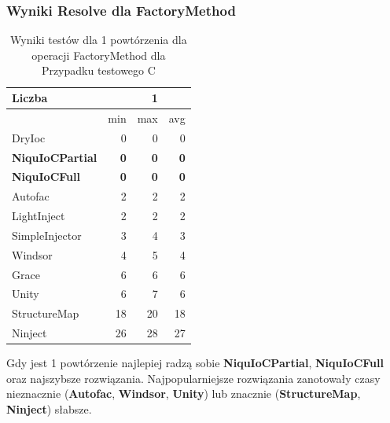 \documentclass[12pt]{article}
\begin{document}
\subsubsection{Wyniki Resolve dla FactoryMethod}
\begin{table}[H]
\captionsetup{belowskip=0pt,aboveskip=0pt}
\begin{center}
\begin{small}
	\begin{tabular}{ | l | r r r | }
    		\hline
Liczba & & 1 & \\ \hline
 & min & max & avg \\ \hline
DryIoc & 0 & 0 & 0 \\ \hline
\textbf{NiquIoCPartial} & \textbf{0} & \textbf{0} & \textbf{0} \\ \hline
\textbf{NiquIoCFull} & \textbf{0} & \textbf{0} & \textbf{0} \\ \hline
Autofac & 2 & 2 & 2 \\ \hline
LightInject & 2 & 2 & 2 \\ \hline
SimpleInjector & 3 & 4 & 3 \\ \hline
Windsor & 4 & 5 & 4 \\ \hline
Grace & 6 & 6 & 6 \\ \hline
Unity & 6 & 7 & 6 \\ \hline
StructureMap & 18 & 20 & 18 \\ \hline
Ninject & 26 & 28 & 27 \\ \hline
  	\end{tabular}
\end{small}
\end{center}
\caption{Wyniki testów dla 1 powtórzenia dla operacji FactoryMethod dla Przypadku testowego C}
\label{TestCaseC_FactoryMethod1}
\end{table}
Gdy jest 1 powtórzenie najlepiej radzą sobie \textbf{NiquIoCPartial}, \textbf{NiquIoCFull} oraz najszybsze rozwiązania. Najpopularniejsze rozwiązania zanotowały czasy nieznacznie (\textbf{Autofac}, \textbf{Windsor}, \textbf{Unity}) lub znacznie (\textbf{StructureMap}, \textbf{Ninject}) słabsze.
\\ \\
\end{document}
